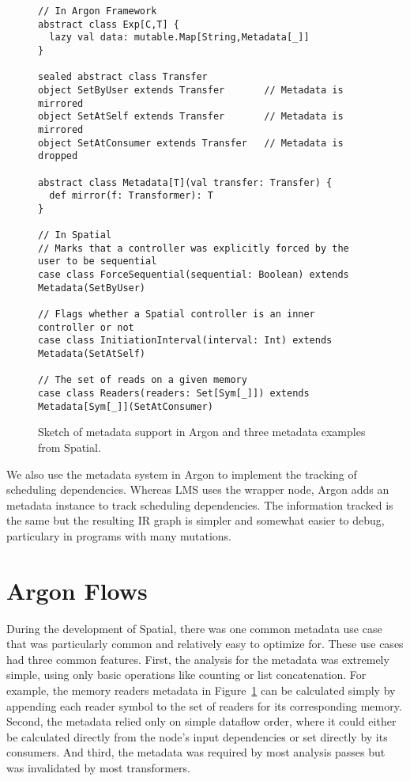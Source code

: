 \begin{figure}
\begin{lstlisting}[language=ScalaDSL]
// In Argon Framework
abstract class Exp[C,T] {
  lazy val data: mutable.Map[String,Metadata[_]]
}

sealed abstract class Transfer
object SetByUser extends Transfer       // Metadata is mirrored
object SetAtSelf extends Transfer       // Metadata is mirrored
object SetAtConsumer extends Transfer   // Metadata is dropped

abstract class Metadata[T](val transfer: Transfer) {
  def mirror(f: Transformer): T
}

// In Spatial
// Marks that a controller was explicitly forced by the user to be sequential
case class ForceSequential(sequential: Boolean) extends Metadata(SetByUser)

// Flags whether a Spatial controller is an inner controller or not
case class InitiationInterval(interval: Int) extends Metadata(SetAtSelf)

// The set of reads on a given memory
case class Readers(readers: Set[Sym[_]]) extends Metadata[Sym[_]](SetAtConsumer)
\end{lstlisting}
\caption{Sketch of metadata support in Argon and three metadata examples from Spatial.}
\label{fig:argon-metadata}
\end{figure}

We also use the metadata system in Argon to implement the tracking of
scheduling dependencies. Whereas LMS uses the  wrapper node,
Argon adds an  metadata instance to track scheduling dependencies.
The information tracked is the same but the resulting IR graph is simpler and
somewhat easier to debug, particulary in programs with many mutations.

\section{Argon Flows}
During the development of Spatial, there was one common metadata use case that
was particularly common and relatively easy to optimize for. These use cases
had three common features. First, the analysis for the metadata was extremely
simple, using only basic operations like counting or list concatenation.
For example, the memory readers metadata in Figure~\ref{fig:argon-metadata} can be
calculated simply by appending each reader symbol to the set of readers for its
corresponding memory. Second, the metadata relied only on simple dataflow order,
where it could either be calculated directly from the node's input dependencies
or set directly by its consumers. And third, the metadata was required by most
analysis passes but was invalidated by most transformers.

